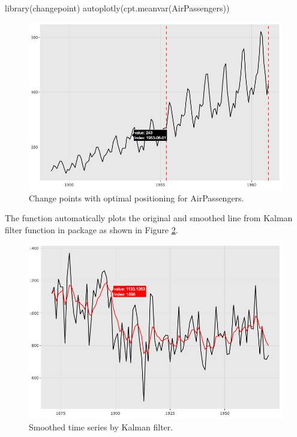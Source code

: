 \begin{Schunk}
\begin{Sinput}
library(changepoint)
autoplotly(cpt.meanvar(AirPassengers))
\end{Sinput}
\end{Schunk}

\begin{figure}[htbp]
  \centering
  \includegraphics[width=145mm,scale=0.8]{images/changepoint_caption.png}
  \caption{Change points with optimal positioning for AirPassengers.}
  \label{figure:changepoint_caption}
\end{figure}

The  function automatically plots the original and
smoothed line from Kalman filter function in  package as shown
in Figure \ref{figure:dlm_caption}.

\begin{Schunk}
\end{Schunk}

\begin{figure}[htbp]
  \centering
  \includegraphics[width=145mm,scale=0.8]{images/dlm_caption.png}
  \caption{Smoothed time series by Kalman filter.}
  \label{figure:dlm_caption}
\end{figure}

